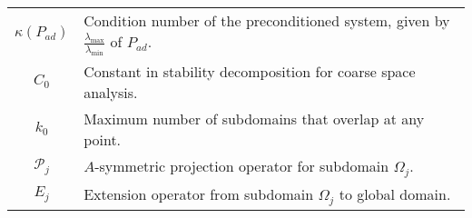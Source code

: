 \begin{longtable}{c p{10cm}}
    $\kappa(P_{ad})$      & Condition number of the preconditioned system, given by $\frac{\lambda_{\max}}{\lambda_{\min}}$ of $P_{ad}$.                     \\
    $C_0$                 & Constant in stability decomposition for coarse space analysis.                                                                   \\
    $k_0$                 & Maximum number of subdomains that overlap at any point.                                                                          \\
    $\mathcal{P}_j$       & $A$-symmetric projection operator for subdomain $\Omega_j$.                                                                      \\
    $E_j$                 & Extension operator from subdomain $\Omega_j$ to global domain.                                                                   \\
\end{longtable}


